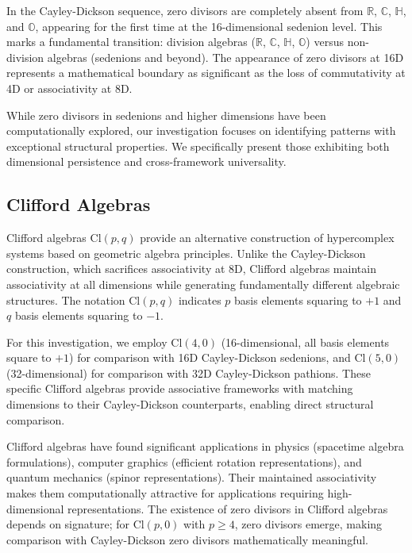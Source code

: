 \documentclass[11pt]{article}
\begin{document}
In the Cayley-Dickson sequence, zero divisors are completely absent from $\mathbb{R}$, $\mathbb{C}$, $\mathbb{H}$, and $\mathbb{O}$, appearing for the first time at the 16-dimensional sedenion level. This marks a fundamental transition: division algebras ($\mathbb{R}$, $\mathbb{C}$, $\mathbb{H}$, $\mathbb{O}$) versus non-division algebras (sedenions and beyond). The appearance of zero divisors at 16D represents a mathematical boundary as significant as the loss of commutativity at 4D or associativity at 8D.

While zero divisors in sedenions and higher dimensions have been computationally explored, our investigation focuses on identifying patterns with exceptional structural properties. We specifically present those exhibiting both dimensional persistence and cross-framework universality.

\subsection{Clifford Algebras}

Clifford algebras $\text{Cl}(p,q)$ provide an alternative construction of hypercomplex systems based on geometric algebra principles. Unlike the Cayley-Dickson construction, which sacrifices associativity at 8D, Clifford algebras maintain associativity at all dimensions while generating fundamentally different algebraic structures. The notation $\text{Cl}(p,q)$ indicates $p$ basis elements squaring to $+1$ and $q$ basis elements squaring to $-1$.

For this investigation, we employ $\text{Cl}(4,0)$ (16-dimensional, all basis elements square to $+1$) for comparison with 16D Cayley-Dickson sedenions, and $\text{Cl}(5,0)$ (32-dimensional) for comparison with 32D Cayley-Dickson pathions. These specific Clifford algebras provide associative frameworks with matching dimensions to their Cayley-Dickson counterparts, enabling direct structural comparison.

Clifford algebras have found significant applications in physics (spacetime algebra formulations), computer graphics (efficient rotation representations), and quantum mechanics (spinor representations). Their maintained associativity makes them computationally attractive for applications requiring high-dimensional representations. The existence of zero divisors in Clifford algebras depends on signature; for $\text{Cl}(p,0)$ with $p \geq 4$, zero divisors emerge, making comparison with Cayley-Dickson zero divisors mathematically meaningful.
\end{document}

